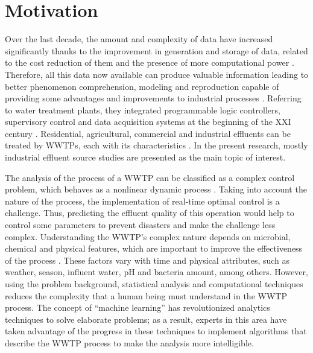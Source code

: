 
\section{Motivation}
\label{s:Motivation}

Over the last decade, the amount and complexity of data have increased significantly thanks to the improvement in generation and storage of data, related to the cost reduction of them and the presence of more computational power \cite{Romero2017}. Therefore, all this data now available can produce valuable information leading to better phenomenon comprehension, modeling and reproduction capable of providing some advantages and improvements to industrial processes \cite{Sbroiavacca2018}. Referring to water treatment plants, they integrated programmable logic controllers, supervisory control and data acquisition systems at the beginning of the XXI century \cite{Newhart2019}. Residential, agricultural, commercial and industrial effluents can be treated by WWTPs, each with its characteristics \cite{Nourani2018}. In the present research, mostly industrial effluent source studies are presented as the main topic of interest.

The analysis of the process of a WWTP can be classified as a complex control problem, which behaves as a nonlinear dynamic process \cite{Pang2019}. Taking into account the nature of the process, the implementation of real-time optimal control is a challenge. Thus, predicting the effluent quality of this operation would help to control some parameters to prevent disasters and make the challenge less complex. Understanding the WWTP’s complex nature depends on microbial, chemical and physical features, which are important to improve the effectiveness of the process \cite{Li2013}. These factors vary with time and physical attributes, such as weather, season, influent water, pH and bacteria amount, among others. However, using the problem background, statistical analysis and computational techniques reduces the complexity that a human being must understand in the WWTP process. The concept of “machine learning” has revolutionized analytics techniques to solve elaborate problems; as a result, experts in this area have taken advantage of the progress in these techniques to implement algorithms that describe the WWTP process to make the analysis more intelligible.

